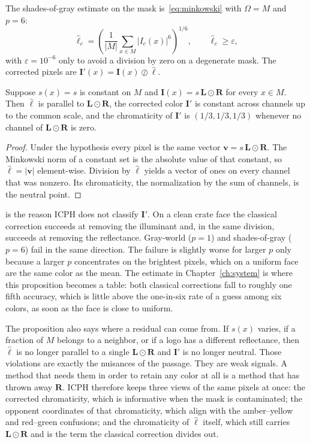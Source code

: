 The shades-of-gray estimate on the mask is~\eqref{eq:minkowski} with $\Omega=M$ and $p=6$:
\begin{equation}
\hat{\ell}_c
= \left(
\frac{1}{\lvert M\rvert}
\sum_{x\in M} \lvert I_c(x)\rvert^{6}
\right)^{1/6},
\qquad
\hat{\ell}_c \ge \varepsilon,
\label{eq:sog-mask}
\end{equation}
with $\varepsilon=10^{-6}$ only to avoid a division by zero on a degenerate mask. The corrected pixels are $\mathbf{I}'(x)=\mathbf{I}(x)\oslash\hat{\ell}$.

\begin{proposition}
\label{prop:uniform}
Suppose $s(x)=s$ is constant on $M$ and $\mathbf{I}(x)=s\,\mathbf{L}\odot\mathbf{R}$ for every $x\in M$. Then $\hat{\ell}$ is parallel to $\mathbf{L}\odot\mathbf{R}$, the corrected color $\mathbf{I}'$ is constant across channels up to the common scale, and the chromaticity of $\mathbf{I}'$ is $(1/3,1/3,1/3)$ whenever no channel of $\mathbf{L}\odot\mathbf{R}$ is zero.
\end{proposition}

\begin{proof}
Under the hypothesis every pixel is the same vector $\mathbf{v}=s\,\mathbf{L}\odot\mathbf{R}$. The Minkowski norm of a constant set is the absolute value of that constant, so $\hat{\ell}=\lvert\mathbf{v}\rvert$ element-wise. Division by $\hat{\ell}$ yields a vector of ones on every channel that was nonzero. Its chromaticity, the normalization by the sum of channels, is the neutral point.
\end{proof}

 is the reason ICPH does not classify $\mathbf{I}'$. On a clean crate face the classical correction succeeds at removing the illuminant and, in the same division, succeeds at removing the reflectance. Gray-world ($p=1$) and shades-of-gray ($p=6$) fail in the same direction. The failure is slightly worse for larger $p$ only because a larger $p$ concentrates on the brightest pixels, which on a uniform face are the same color as the mean. The estimate in Chapter~\ref{ch:system} is where this proposition becomes a table: both classical corrections fall to roughly one fifth accuracy, which is little above the one-in-six rate of a guess among six colors, as soon as the face is close to uniform.

The proposition also says where a residual can come from. If $s(x)$ varies, if a fraction of $M$ belongs to a neighbor, or if a logo has a different reflectance, then $\hat{\ell}$ is no longer parallel to a single $\mathbf{L}\odot\mathbf{R}$ and $\mathbf{I}'$ is no longer neutral. Those violations are exactly the nuisances of the passage. They are weak signals. A method that needs them in order to retain any color at all is a method that has thrown away $\mathbf{R}$. ICPH therefore keeps three views of the same pixels at once: the corrected chromaticity, which is informative when the mask is contaminated; the opponent coordinates of that chromaticity, which align with the amber--yellow and red--green confusions; and the chromaticity of $\hat{\ell}$ itself, which still carries $\mathbf{L}\odot\mathbf{R}$ and is the term the classical correction divides out.

